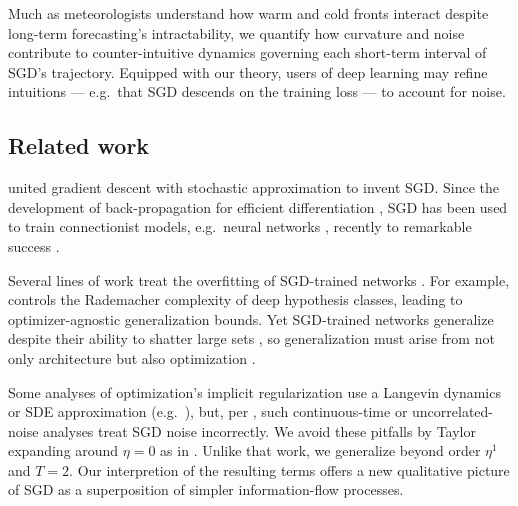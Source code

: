 \documentclass[anon,12pt]{colt2021} %
\begin{document}
{                Much as meteorologists understand how warm and cold fronts
                interact despite long-term forecasting's intractability, we
                quantify how curvature and noise contribute to
                counter-intuitive dynamics governing each short-term interval
                of SGD's trajectory.  Equipped with our theory, users of deep
                learning may refine intuitions --- e.g.\ that SGD descends on
                the training loss --- to account for noise.

        \subsection{Related work}\label{sect:related}
    

            \cite{ki52} united gradient descent \citep{ca47} with stochastic
            approximation \citep{ro51} to invent SGD.  Since the development of
            back-propagation for efficient differentiation \citep{we74}, SGD
            has been used to train connectionist models, e.g.\ neural networks
            \citep{bo91}, recently to remarkable success \citep{le15}.
        
        
            Several lines of work treat the overfitting of SGD-trained networks
            \citep{ne17a}.  For example, \cite{ba17} controls the Rademacher
            complexity of deep hypothesis classes, leading to
            optimizer-agnostic generalization bounds.  Yet SGD-trained networks
            generalize despite their ability to shatter large sets
            \citep{zh17}, so generalization must arise from not only
            architecture but also optimization \citep{ne17b}.  

            Some analyses of optimization's implicit regularization use a
            Langevin dynamics or SDE approximation (e.g.\ \cite{ch18,zh19}),
            but, per \cite{ya19a}, such continuous-time or uncorrelated-noise
            analyses treat SGD noise incorrectly.
            We avoid these pitfalls by Taylor expanding around $\eta=0$ as in
            \cite{ro18}.  Unlike that work, we generalize beyond order $\eta^1$
            and $T=2$.  %
            Our interpretion of the resulting
            terms offers a new qualitative picture of SGD as a superposition of
            simpler information-flow processes.
            
}
\end{document}

